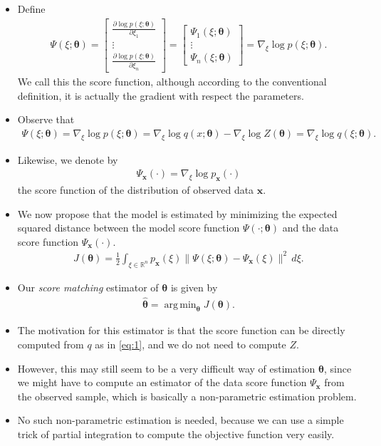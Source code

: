 \documentclass[10pt]{article}
\newcommand{\RR}{\mathbb{R}}
\DeclareMathOperator*{\argmin}{arg\,min}
\begin{document}
\begin{itemize}
\item Define
\begin{align*}
\Psi(\xi;\bm{\theta}) =
\begin{bmatrix}
\frac{\partial \log p(\xi;\bm{\theta})}{\partial \xi_1} \\
\vdots \\
\frac{\partial \log p(\xi;\bm{\theta})}{\partial \xi_n}
\end{bmatrix} =
\begin{bmatrix}
\Psi_1(\xi;\bm{\theta}) \\
\vdots \\
\Psi_n(\xi;\bm{\theta})
\end{bmatrix} = \nabla_\xi \log p(\xi;\bm{\theta}).
\end{align*}
We call this the score function, although according to the conventional definition, it is actually the gradient with respect the parameters.
\item Observe that
\begin{align}
\Psi(\xi;\bm{\theta}) = \nabla_\xi \log p(\xi;\bm{\theta}) = \nabla_\xi \log q(x;\bm{\theta}) - \nabla_\xi \log Z(\bm{\theta}) = \nabla_\xi \log q(\xi;\bm{\theta}). \label{eq:1}
\end{align}
\item Likewise, we denote by
\begin{align*}
\Psi_\mathbf{x}(\cdot) = \nabla_\xi \log p_\mathbf{x}(\cdot)
\end{align*}
the score function of the distribution of observed data $\mathbf{x}$.
\item We now propose that the model is estimated by minimizing the expected squared distance between the model score function $\Psi(\cdot;\bm{\theta})$ and the data score function $\Psi_\mathbf{x}(\cdot)$.
\begin{align}
J(\bm{\theta}) = \frac{1}{2} \int_{\xi \in \RR^n} p_\mathbf{x}(\xi) \|\Psi(\xi;\bm{\theta}) - \Psi_\mathbf{x}(\xi)\|^2 \, d\xi. \label{eq:2}
\end{align}
\item Our \textit{score matching} estimator of $\bm{\theta}$ is given by
\begin{align*}
\bm{\hat{\theta}} = \argmin_{\bm{\theta}} J(\bm{\theta}).
\end{align*}
\item The motivation for this estimator is that the score function can be directly computed from $q$ as in \eqref{eq:1}, and we do not need to compute $Z$.
\item However, this may still seem to be a very difficult way of estimation $\bm{\theta}$, since we might have to compute an estimator of the data score function $\Psi_\mathbf{x}$ from the observed sample, which is basically a non-parametric estimation problem.
\item No such non-parametric estimation is needed, because we can use a simple trick of partial integration to compute the objective function very easily.
\end{itemize}
\end{document}
